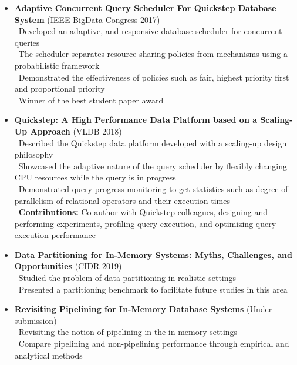 \documentclass[11pt]{article}
\begin{document}
\begin{itemize}\addtolength{\itemsep}{-0.5\baselineskip}
\item{\textbf{Adaptive Concurrent Query Scheduler For Quickstep Database System} (IEEE BigData Congress 2017)}\\
		\textendash\ Developed an adaptive, and responsive database scheduler for concurrent queries\\
		\textendash\ The scheduler separates resource sharing policies from mechanisms using a probabilistic framework \\
		\textendash\ Demonstrated the effectiveness of policies such as fair, highest priority first and proportional priority\\
		\textendash\ Winner of the best student paper award\\
		
\item{\textbf{Quickstep: A High Performance Data Platform based
on a Scaling-Up Approach} (VLDB 2018)}	\\
		\textendash\ Described the Quickstep data platform developed with a scaling-up design philosophy\\
		\textendash\ Showcased the adaptive nature of the query scheduler by flexibly changing CPU resources while the query is in progress \\
		\textendash\ Demonstrated query progress monitoring to get statistics such as degree of parallelism of relational operators and their execution times\\
		\textendash\ \textbf{Contributions:} Co-author with Quickstep colleagues, designing and performing experiments, profiling query execution, and optimizing query execution performance\\

\item{\textbf{Data Partitioning for In-Memory Systems: Myths, Challenges, and Opportunities} (CIDR 2019)}	\\
		\textendash\ Studied the problem of data partitioning in realistic settings\\
		\textendash\ Presented a partitioning benchmark to facilitate future studies in this area\\ 

\item{\textbf{Revisiting Pipelining for In-Memory Database Systems} (Under submission)}	\\
		\textendash\ Revisiting the notion of pipelining in the in-memory settings\\
		\textendash\ Compare pipelining and non-pipelining performance through empirical and analytical methods\\ 


\end{itemize}
\end{document}

